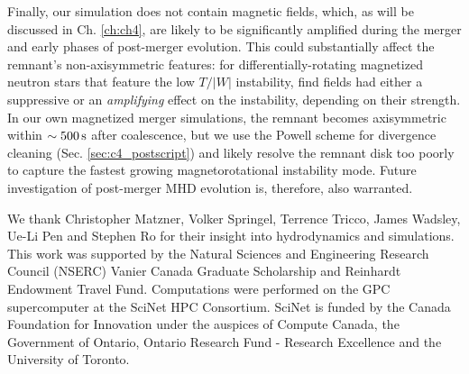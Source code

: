 
Finally, our simulation does not contain magnetic fields, which, as will be discussed in Ch. \ref{ch:ch4}, are likely to be significantly amplified during the merger and early phases of post-merger evolution.  This could substantially affect the remnant's non-axisymmetric features: for differentially-rotating magnetized neutron stars that feature the low $T/|W|$ instability, \cite{muhl+14} find fields had either a suppressive or an \textit{amplifying} effect on the instability, depending on their strength.  In our own magnetized merger simulations, the remnant becomes axisymmetric within $\sim500\,\mathrm{s}$ after coalescence, but we use the Powell scheme for divergence cleaning (Sec. \ref{sec:c4_postscript}) and likely resolve the remnant disk too poorly to capture the fastest growing magnetorotational instability mode.  Future investigation of post-merger MHD evolution is, therefore, also warranted.

\vspace{10mm}

We thank Christopher Matzner, Volker Springel, Terrence Tricco, James Wadsley, Ue-Li Pen and Stephen Ro for their insight into hydrodynamics and simulations.  This work was supported by the Natural Sciences and Engineering Research Council (NSERC) Vanier Canada Graduate Scholarship and Reinhardt Endowment Travel Fund.  Computations were performed on the GPC supercomputer at the SciNet HPC Consortium.  SciNet \citep{loke+10} is funded by the Canada Foundation for Innovation under the auspices of Compute Canada, the Government of Ontario, Ontario Research Fund - Research Excellence and the University of Toronto.


